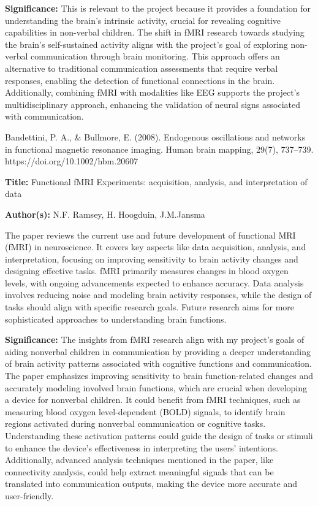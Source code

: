 \documentclass[12pt, research paper]{report}
\begin{document}
	\noindent \textbf{Significance:} This is relevant to the project because it provides a foundation for understanding the brain's intrinsic activity, crucial for revealing cognitive capabilities in non-verbal children. The shift in fMRI research towards studying the brain's self-sustained activity aligns with the project's goal of exploring non-verbal communication through brain monitoring. This approach offers an alternative to traditional communication assessments that require verbal responses, enabling the detection of functional connections in the brain. Additionally, combining fMRI with modalities like EEG supports the project's multidisciplinary approach, enhancing the validation of neural signs associated with communication. 
	\bigskip 
	
	\noindent Bandettini, P. A., \& Bullmore, E. (2008). Endogenous oscillations and networks in functional magnetic resonance imaging. Human brain mapping, 29(7), 737–739. https://doi.org/10.1002/hbm.20607
	\bigskip 
	\bigskip
	
	\noindent \textbf{Title:} Functional fMRI Experiments: acquisition, analysis, and interpretation of data
	
	\noindent \textbf{Author(s):} N.F. Ramsey, H. Hoogduin, J.M.Jansma
	\bigskip 
	
	The paper reviews the current use and future development of functional MRI (fMRI) in neuroscience. It covers key aspects like data acquisition, analysis, and interpretation, focusing on improving sensitivity to brain activity changes and designing effective tasks. fMRI primarily measures changes in blood oxygen levels, with ongoing advancements expected to enhance accuracy. Data analysis involves reducing noise and modeling brain activity responses, while the design of tasks should align with specific research goals. Future research aims for more sophisticated approaches to understanding brain functions.
	\bigskip
	
	\noindent \textbf{Significance:} The insights from fMRI research align with my project's goals of aiding nonverbal children in communication by providing a deeper understanding of brain activity patterns associated with cognitive functions and communication. The paper emphasizes improving sensitivity to brain function-related changes and accurately modeling involved brain functions, which are crucial when developing a device for nonverbal children.	It could benefit from fMRI techniques, such as measuring blood oxygen level-dependent (BOLD) signals, to identify brain regions activated during nonverbal communication or cognitive tasks. Understanding these activation patterns could guide the design of tasks or stimuli to enhance the device's effectiveness in interpreting the users' intentions. Additionally, advanced analysis techniques mentioned in the paper, like connectivity analysis, could help extract meaningful signals that can be translated into communication outputs, making the device more accurate and user-friendly.
	\bigskip
	
\end{document}
